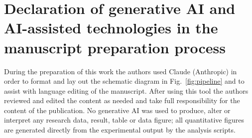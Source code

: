\documentclass[preprint,12pt,authoryear]{elsarticle}
\begin{document}
\section*{Declaration of generative AI and AI-assisted technologies in the manuscript preparation process}
During the preparation of this work the authors used Claude (Anthropic) in order to format and lay out the schematic diagram in Fig.~\ref{fig:pipeline} and to assist with language editing of the manuscript. After using this tool the authors reviewed and edited the content as needed and take full responsibility for the content of the publication. No generative AI was used to produce, alter or interpret any research data, result, table or data figure; all quantitative figures are generated directly from the experimental output by the analysis scripts.



\end{document}
